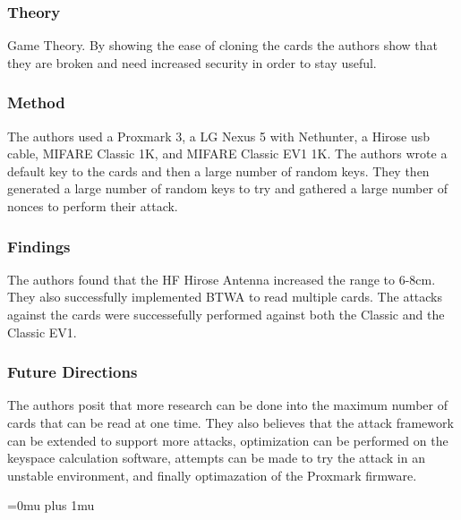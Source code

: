 \subsubsection{Theory}

\noindent
Game Theory.  By showing the ease of cloning the cards the authors show that they are broken and need increased security in order to stay useful.

\subsubsection{Method}

\noindent
The authors used a Proxmark 3, a LG Nexus 5 with Nethunter, a Hirose usb cable, MIFARE Classic 1K, and MIFARE Classic EV1 1K.  The authors wrote a default key to the cards and then a large number of random keys.  They then generated a large number of random keys to try and gathered a large number of nonces to perform their attack.

\subsubsection{Findings}

\noindent
The authors found that the HF Hirose Antenna increased the range to 6-8cm.  They also successfully implemented BTWA to read multiple cards.  The attacks against the cards were successefully performed against both the Classic and the Classic EV1.

\subsubsection{Future Directions}

\noindent
The authors posit that more research can be done into the maximum number of cards that can be read at one time.  They also believes that the attack framework can be extended to support more attacks, optimization can be performed on the keyspace calculation software, attempts can be made to try the attack in an unstable environment, and finally optimazation of the Proxmark firmware.

\Urlmuskip=0mu plus 1mu\relax
\pagebreak